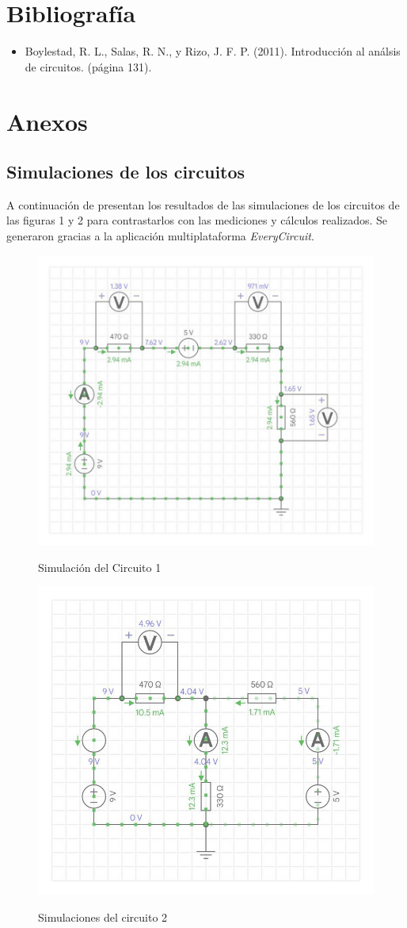 \documentclass[a4paper,12pt]{article}
\begin{document}
\section{Bibliografía}

\begin{itemize}
\item Boylestad, R. L., Salas, R. N., y Rizo, J. F. P. (2011). Introducción al análsis de circuitos. (página 131).
\end{itemize}

\section{Anexos}
\subsection{Simulaciones de los circuitos}

A continuación de presentan los resultados de las simulaciones de los circuitos de las figuras 1 y 2 para contrastarlos con las mediciones y cálculos realizados. Se generaron gracias a la aplicación multiplataforma \textit{EveryCircuit}\texttrademark. \\



\vspace{.5cm}

\begin{figure}[!h]
\centering
	\includegraphics[width=.7\textwidth]{fig1}
	\label{fig5}
	 \caption{Simulación del Circuito 1}
\end{figure}

\vspace{.5cm}


\begin{figure}[!h]
\centering
	\includegraphics[width=.7\textwidth]{fig2}
	\label{fig5}
	 \caption{Simulaciones del circuito 2}
\end{figure}

\vspace{.5cm}
\end{document}
